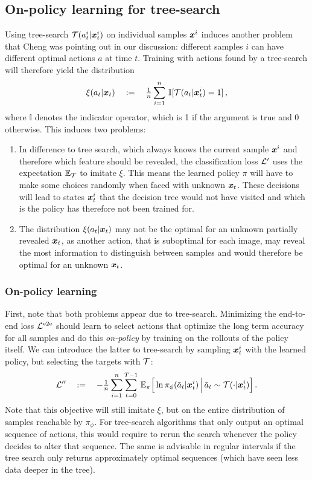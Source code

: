 \subsection{On-policy learning for tree-search}
Using tree-search $\mathcal{T}(a^i_t|\bm x^i_t)$ 
on individual samples $\bm x^i$
induces another problem that 
Cheng was pointing out in our discussion: 
different samples $i$ can have different optimal actions $a$ at time $t$.
Training with actions found by a tree-search 
will therefore yield the distribution 
$$
	\xi(a_t|\bm x_t) 
	\quad:=\quad {\textstyle \frac{1}{n}}\sum_{i=1}^n \,
	\mathbb{I}[\mathcal{T}(a_t| \bm x^i_t) = 1] \,,
$$
where $\mathbb{I}$ denotes the indicator operator, 
which is 1 if the argument is true and 0 otherwise. 
This induces two problems:
\begin{enumerate}
	\item In difference to tree search, 
		which always knows the current sample $\bm x^i$
		and therefore which feature should be revealed, 
		the classification loss $\mathcal{L}'$
		uses the expectation $\mathbb{E}_{\mathcal{T}}$ to imitate $\xi$.
		This means the learned policy $\pi$ 
		will have to make some choices randomly when 
		faced with unknown $\bm x_t$.
		These decisions will lead to states $\bm x^i_t$
		that the decision tree would not have visited
		and which is the policy has therefore not been trained for. 
	\item The distribution $\xi(a_t|\bm x_t)$ may not be the optimal
		for an unknown partially revealed $\bm x_t$,
		as another action, that is suboptimal for each image,
		may reveal the most information to distinguish between 
		samples and would therefore be optimal for an unknown $\bm x_t$.
\end{enumerate}

\subsubsection{On-policy learning}
First, note that both problems appear due to tree-search.
Minimizing the end-to-end loss $\mathcal{L}^\text{e2e}$
should learn to select actions that optimize the long term
accuracy for all samples and do this {\em on-policy}
by training on the rollouts of the policy itself.
We can introduce the latter to tree-search
by sampling $\bm x_t^i$ with the learned policy, 
but selecting the targets with $\mathcal{T}$:
$$
	\mathcal{L}'' \quad:=\quad
	-{\textstyle \frac{1}{n}} \sum_{i=1}^{n} \sum_{t=0}^{T-1}\,  
	\mathbb{E}_{\pi}\Big[ \ln \pi_\phi(\bar a_t| \bm x^i_t) 
		\,\Big|\, \bar a_t \sim \mathcal{T}(\cdot|\bm x_t^i) \Big] \,.
$$
Note that this objective will still imitate $\xi$,
but on the entire distribution of samples reachable by $\pi_\phi$.
For tree-search algorithms that only output 
an optimal sequence of actions, 
this would require to rerun the search whenever 
the policy decides to alter that sequence.
The same is advisable in regular intervals
if the tree search only returns approximately optimal sequences
(which have seen less data deeper in the tree).

